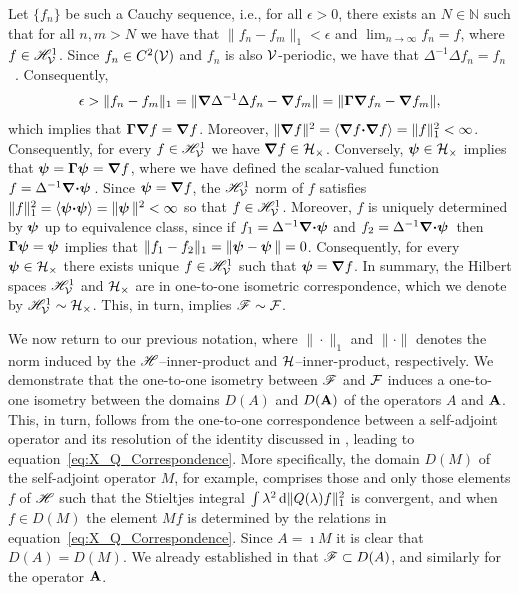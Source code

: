 \documentclass[amsa]{ipart}
\begin{document}
Let $\{f_n\}$ be such a Cauchy sequence, i.e., for all $\epsilon>0$, there
exists an $N\in\mathbb{N}$ such that for all $n,m>N$ we have that
$\|f_n-f_m\|_1<\epsilon$ and $\lim_{n\to\infty}f_n=f$, where $f\in\mathscr{H}^1_{\mathcal{V}}$. Since
$f_n\in C^2(\mathcal{V})$ and $f_n$ is also $\mathcal{V}$-periodic, we have that $\Delta^{-1}\Delta
f_n=f_n$~\cite{McOwen:2003:PDE}. Consequently,  
%
\begin{align}
  \epsilon>\|f_n-f_m\|_1
   =\|\bnabla \Delta^{-1}\Delta f_n-\bnabla f_m\|
   =\|\bGamma\bnabla f_n-\bnabla f_m\|,
\end{align}
%
which implies that $\mbox{\boldmath${\Gamma}$}\mbox{\boldmath${\nabla}$} f=\mbox{\boldmath${\nabla}$} f$. Moreover, $\|\mbox{\boldmath${\nabla}$}
f\|^2=\langle\mbox{\boldmath${\nabla}$} f\mbox{\boldmath${\cdot}$}\mbox{\boldmath${\nabla}$} f\rangle=\|f\|_1^2<\infty$. Consequently, for every   
$f\in\mathscr{H}^1_{\mathcal{V}}$ we have $\mbox{\boldmath${\nabla}$} f\in\mathcal{H}_\times$. Conversely,
$\boldsymbol{\psi}\in\mathcal{H}_\times$ implies that $\boldsymbol{\psi}=\mbox{\boldmath${\Gamma}$}\boldsymbol{\psi}=\mbox{\boldmath${\nabla}$} f$, where
we have defined the scalar-valued function
$f=\Delta^{-1}\mbox{\boldmath${\nabla}$} \mbox{\boldmath${\cdot}$}\boldsymbol{\psi}\,$. Since $\boldsymbol{\psi}=\mbox{\boldmath${\nabla}$} f$, the
$\mathscr{H}^1_{\mathcal{V}}$ norm of $f$ satisfies
$\|f\|_1^2=\langle\boldsymbol{\psi}\mbox{\boldmath${\cdot}$}\boldsymbol{\psi}\rangle=\|\boldsymbol{\psi}\,\|^2<\infty$ so that
$f\in\mathscr{H}^1_{\mathcal{V}}$. Moreover, $f$ is uniquely determined by $\boldsymbol{\psi}$ up
to equivalence class, since if $f_1=\Delta^{-1}\mbox{\boldmath${\nabla}$} \mbox{\boldmath${\cdot}$}\boldsymbol{\psi}$ and
$f_2=\Delta^{-1}\mbox{\boldmath${\nabla}$} \mbox{\boldmath${\cdot}$}\boldsymbol{\psi}\,$ then $\mbox{\boldmath${\Gamma}$}\boldsymbol{\psi}=\boldsymbol{\psi}$ implies
that $\|f_1-f_2\|_1=\|\boldsymbol{\psi}-\boldsymbol{\psi}\,\|=0$. Consequently, for every  
$\boldsymbol{\psi}\in\mathcal{H}_\times$ there exists unique $f\in\mathscr{H}^1_{\mathcal{V}}$ such that
$\boldsymbol{\psi}=\mbox{\boldmath${\nabla}$} f$.  In summary, the Hilbert spaces $\mathscr{H}^1_{\mathcal{V}}$ and
$\mathcal{H}_\times$ are in one-to-one isometric correspondence, which we denote by
$\mathscr{H}^1_{\mathcal{V}}\sim\mathcal{H}_\times$. This, in turn, implies  $\mathscr{F}\sim\mathcal{F}$.  



We now return to our previous notation, where $\|\cdot\|_1$ and $\|\cdot\|$
denotes the norm induced by the $\mathscr{H}$--inner-product and
$\mathcal{H}$--inner-product, respectively. We demonstrate that the one-to-one
isometry between $\mathscr{F}$ and $\mathcal{F}$ induces a one-to-one isometry between
the domains $D(A)$ and $D(\mathbf{A})$ of the operators $A$ and $\mathbf{A}$. This,
in turn, follows from the one-to-one 
correspondence between a self-adjoint operator and its resolution of
the identity discussed in , leading to
equation~\eqref{eq:X_Q_Correspondence}. More specifically, the domain
$D(M)$ of the self-adjoint operator $M$, for example, comprises those
and only those elements $f$ of $\mathscr{H}$ such that the Stieltjes integral
$\int\lambda^2\,\mathrm{d}\|Q(\lambda)f\|_1^2$ is convergent, and when $f\in D(M)$ the element $Mf$
is determined by the relations in
equation~\eqref{eq:X_Q_Correspondence}. Since $A=\imath M$ it is clear that
$D(A)=D(M)$. We already established in
 that $\mathscr{F}\subset D(A)$, and similarly for the
operator $\mathbf{A}$.
\end{document}
